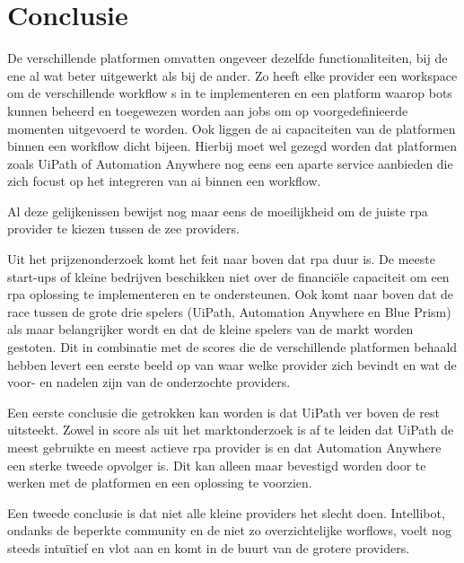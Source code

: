 \chapter{Conclusie}
\label{ch:conclusie}
De verschillende platformen omvatten ongeveer dezelfde functionaliteiten, bij de ene al wat beter uitgewerkt als bij de ander. Zo heeft elke provider een workspace om de verschillende \gls{workflow} s in te implementeren en een platform waarop bots kunnen beheerd en toegewezen worden aan jobs om op voorgedefinieerde momenten uitgevoerd te worden. Ook liggen de \acrshort{ai} capaciteiten van de platformen binnen een \gls{workflow} dicht bijeen. Hierbij moet wel gezegd worden dat platformen zoals UiPath of Automation Anywhere nog eens een aparte service aanbieden die zich focust op het integreren van \acrshort{ai} binnen een \gls{workflow}.

Al deze gelijkenissen bewijst nog maar eens de moeilijkheid om de juiste \acrshort{rpa} provider te kiezen tussen de zee providers.

Uit het prijzenonderzoek komt het feit naar boven dat \acrshort{rpa} duur is. De meeste start-ups of kleine bedrijven beschikken niet over de financiële capaciteit om een \acrshort{rpa} oplossing te implementeren en te ondersteunen. Ook komt naar boven dat de race tussen de grote drie spelers (UiPath, Automation Anywhere en Blue Prism) als maar belangrijker wordt en dat de kleine spelers van de markt worden gestoten. Dit in combinatie met de scores die de verschillende platformen behaald hebben levert een eerste beeld op van waar welke provider zich bevindt en wat de voor- en nadelen zijn van de onderzochte providers.

Een eerste conclusie die getrokken kan worden is dat UiPath ver boven de rest uitsteekt. Zowel in score als uit het marktonderzoek is af te leiden dat UiPath de meest gebruikte en meest actieve \acrshort{rpa} provider is en dat Automation Anywhere een sterke tweede opvolger is. Dit kan alleen maar bevestigd worden door te werken met de platformen en een oplossing te voorzien.

Een tweede conclusie is dat niet alle kleine providers het slecht doen. Intellibot, ondanks de beperkte community en de niet zo overzichtelijke worflows, voelt nog steeds intuïtief en vlot aan en komt in de buurt van de grotere providers.

